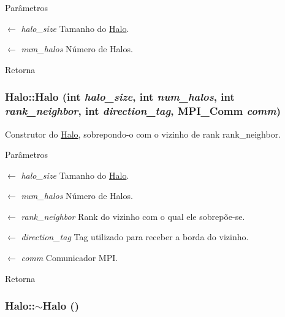 \begin{DoxyParams}{Parâmetros}
\item[\mbox{$\leftarrow$} {\em halo\_\-size}]Tamanho do \hyperlink{classHalo}{Halo}. \item[\mbox{$\leftarrow$} {\em num\_\-halos}]Número de Halos. \end{DoxyParams}
\begin{DoxyReturn}{Retorna}

\end{DoxyReturn}
\hypertarget{classHalo_a9769c8e449f3e4ea6cd8a398a2ad45d8}{
\subsubsection[{Halo}]{\setlength{\rightskip}{0pt plus 5cm}Halo::Halo (int {\em halo\_\-size}, \/  int {\em num\_\-halos}, \/  int {\em rank\_\-neighbor}, \/  int {\em direction\_\-tag}, \/  MPI\_\-Comm {\em comm})}}
\label{classHalo_a9769c8e449f3e4ea6cd8a398a2ad45d8}


Construtor do \hyperlink{classHalo}{Halo}, sobrepondo-\/o com o vizinho de rank rank\_\-neighbor. 


\begin{DoxyParams}{Parâmetros}
\item[\mbox{$\leftarrow$} {\em halo\_\-size}]Tamanho do \hyperlink{classHalo}{Halo}. \item[\mbox{$\leftarrow$} {\em num\_\-halos}]Número de Halos. \item[\mbox{$\leftarrow$} {\em rank\_\-neighbor}]Rank do vizinho com o qual ele sobrepõe-\/se. \item[\mbox{$\leftarrow$} {\em direction\_\-tag}]Tag utilizado para receber a borda do vizinho. \item[\mbox{$\leftarrow$} {\em comm}]Comunicador MPI. \end{DoxyParams}
\begin{DoxyReturn}{Retorna}

\end{DoxyReturn}
\hypertarget{classHalo_af14b14344802b6c82d9099f49b74b004}{
\subsubsection[{$\sim$Halo}]{\setlength{\rightskip}{0pt plus 5cm}Halo::$\sim$Halo ()}}
\label{classHalo_af14b14344802b6c82d9099f49b74b004}


